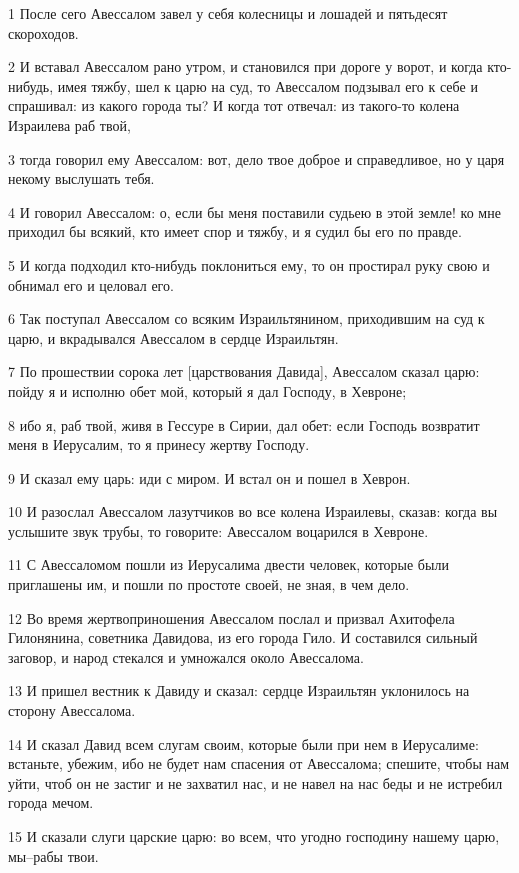 \par 1 После сего Авессалом завел у себя колесницы и лошадей и пятьдесят скороходов.
\par 2 И вставал Авессалом рано утром, и становился при дороге у ворот, и когда кто-нибудь, имея тяжбу, шел к царю на суд, то Авессалом подзывал его к себе и спрашивал: из какого города ты? И когда тот отвечал: из такого-то колена Израилева раб твой,
\par 3 тогда говорил ему Авессалом: вот, дело твое доброе и справедливое, но у царя некому выслушать тебя.
\par 4 И говорил Авессалом: о, если бы меня поставили судьею в этой земле! ко мне приходил бы всякий, кто имеет спор и тяжбу, и я судил бы его по правде.
\par 5 И когда подходил кто-нибудь поклониться ему, то он простирал руку свою и обнимал его и целовал его.
\par 6 Так поступал Авессалом со всяким Израильтянином, приходившим на суд к царю, и вкрадывался Авессалом в сердце Израильтян.
\par 7 По прошествии сорока лет [царствования Давида], Авессалом сказал царю: пойду я и исполню обет мой, который я дал Господу, в Хевроне;
\par 8 ибо я, раб твой, живя в Гессуре в Сирии, дал обет: если Господь возвратит меня в Иерусалим, то я принесу жертву Господу.
\par 9 И сказал ему царь: иди с миром. И встал он и пошел в Хеврон.
\par 10 И разослал Авессалом лазутчиков во все колена Израилевы, сказав: когда вы услышите звук трубы, то говорите: Авессалом воцарился в Хевроне.
\par 11 С Авессаломом пошли из Иерусалима двести человек, которые были приглашены им, и пошли по простоте своей, не зная, в чем дело.
\par 12 Во время жертвоприношения Авессалом послал и призвал Ахитофела Гилонянина, советника Давидова, из его города Гило. И составился сильный заговор, и народ стекался и умножался около Авессалома.
\par 13 И пришел вестник к Давиду и сказал: сердце Израильтян уклонилось на сторону Авессалома.
\par 14 И сказал Давид всем слугам своим, которые были при нем в Иерусалиме: встаньте, убежим, ибо не будет нам спасения от Авессалома; спешите, чтобы нам уйти, чтоб он не застиг и не захватил нас, и не навел на нас беды и не истребил города мечом.
\par 15 И сказали слуги царские царю: во всем, что угодно господину нашему царю, мы--рабы твои.
